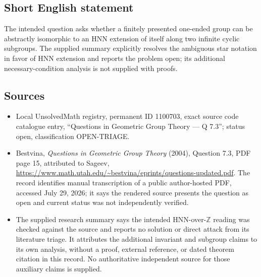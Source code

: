 \documentclass[11pt]{article}
\newcommand{\Z}{\mathbb{Z}}
\begin{document}
\subsection{Short English statement}
The intended question asks whether a finitely presented one-ended group can be abstractly isomorphic to an HNN extension of itself along two infinite cyclic subgroups. The supplied summary explicitly resolves the ambiguous star notation in favor of HNN extension and reports the problem open; its additional necessary-condition analysis is not supplied with proofs.
\subsection{Sources}
\begin{itemize}
\item Local UnsolvedMath registry, permanent ID 1100703, exact source code catalogue entry, ``Questions in Geometric Group Theory --- Q 7.3''; status open, classification OPEN-TRIAGE.
\item Bestvina, \emph{Questions in Geometric Group Theory} (2004), Question 7.3, PDF page 15, attributed to Sageev, \url{https://www.math.utah.edu/~bestvina/eprints/questions-updated.pdf}. The record identifies manual transcription of a public author-hosted PDF, accessed July 29, 2026; it says the rendered source presents the question as open and current status was not independently verified.
\item The supplied research summary says the intended HNN-over-$\Z$ reading was checked against the source and reports no solution or direct attack from its literature triage. It attributes the additional invariant and subgroup claims to its own analysis, without a proof, external reference, or dated theorem citation in this record. No authoritative independent source for those auxiliary claims is supplied.
\end{itemize}
\end{document}
